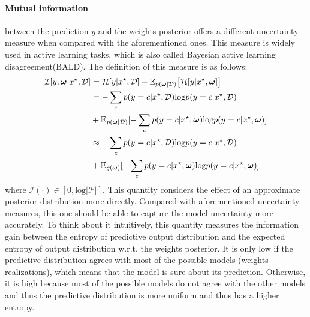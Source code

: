 \paragraph{Mutual information} between the prediction $y$ and the weights posterior offers a different uncertainty measure when compared with the aforementioned ones.
This measure is widely used in active learning tasks\cite{houlsby2011bayesian}, which is also called Bayesian active learning disagreement(BALD).
The definition of this measure is as follows:
\begin{equation}\label{mi}	
\begin{aligned}
\mathcal I[y,\boldsymbol \omega|x^\star, \mathcal D] &= \mathcal H[y|x^\star, \mathcal D] - \mathbb E_{p(\boldsymbol \omega| \mathcal D)}\big[\mathcal H[y|x^\star, \boldsymbol \omega] \big] \\
&= -\sum_{c}p(y=c|x^\star, \mathcal D)\text{log}p(y=c|x^\star, \mathcal D) \\ &+ \mathbb E_{p(\boldsymbol \omega|\mathcal D)}[-\sum_{c}p(y=c|x^\star, \boldsymbol \omega)\text{log}p(y=c|x^\star, \boldsymbol \omega)] \\
&\approx -\sum_{c}p(y=c|x^\star, \mathcal D)\text{log}p(y=c|x^\star, \mathcal D) \\ &+ \mathbb E_{q(\boldsymbol \omega)}[-\sum_{c}p(y=c|x^\star, \boldsymbol \omega)\text{log}p(y=c|x^\star, \boldsymbol \omega)]
\end{aligned}
\end{equation}
where $\mathcal I(\cdot) \in [0,\text{log}{|\mathcal P|}]$.
This quantity considers the effect of an approximate posterior distribution more directly.
Compared with aforementioned uncertainty measures, this one should be able to capture the model uncertainty more accurately.
To think about it intuitively, this quantity measures the information gain between the entropy of predictive output distribution and the expected entropy of output distribution w.r.t. the weights posterior.
It is only low if the predictive distribution agrees with most of the possible models (weights realizations), which means that the model is sure about its prediction.
Otherwise, it is high because most of the possible models do not agree with the other models and thus the predictive distribution is more uniform and thus has a higher entropy.

